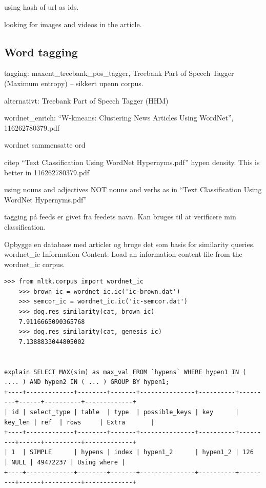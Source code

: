 using hash of url as ids.

looking for images and videos in the article.

\subsection{Word tagging}
tagging: maxent\_treebank\_pos\_tagger, Treebank Part of Speech Tagger (Maximum entropy) -- sikkert upenn corpus.

alternativt: Treebank Part of Speech Tagger (HHM)


wordnet\_enrich: ``W-kmeans: Clustering News Articles Using WordNet'', 116262780379.pdf

wordnet sammensatte ord

citep ``Text Classification Using WordNet Hypernyms.pdf''
hypen density. This is better in 116262780379.pdf

using nouns and adjectives NOT nouns and verbs as in ``Text Classification Using WordNet Hypernyms.pdf''


tagging på feeds er givet fra feedets navn. Kan bruges til at verificere min classification.



Opbygge en database med articler og bruge det som basis for similarity queries.
wordnet\_ic Information Content: Load an information content file from the wordnet\_ic corpus.
\begin{lstlisting}[caption=cap,label=lst:lab,float=htbp]
	>>> from nltk.corpus import wordnet_ic
	>>> brown_ic = wordnet_ic.ic('ic-brown.dat')
	>>> semcor_ic = wordnet_ic.ic('ic-semcor.dat')
	>>> dog.res_similarity(cat, brown_ic)
	7.9116665090365768
	>>> dog.res_similarity(cat, genesis_ic)
	7.1388833044805002


explain SELECT MAX(sim) as max_val FROM `hypens` WHERE hypen1 IN ( .... ) AND hypen2 IN ( ... ) GROUP BY hypen1;
+----+-------------+--------+-------+---------------+----------+---------+------+----------+-------------+
| id | select_type | table  | type  | possible_keys | key      | key_len | ref  | rows     | Extra       |
+----+-------------+--------+-------+---------------+----------+---------+------+----------+-------------+
| 1  | SIMPLE      | hypens | index | hypen1_2      | hypen1_2 | 126     | NULL | 49472237 | Using where |
+----+-------------+--------+-------+---------------+----------+---------+------+----------+-------------+
\end{lstlisting}


